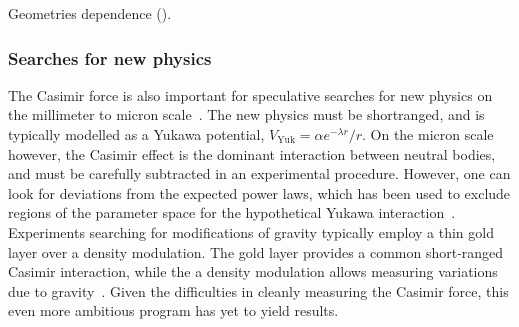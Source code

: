     Geometries dependence ().
    



\subsubsection{Searches for new physics}
The Casimir force is also important for speculative searches for new physics on the millimeter to micron
scale~\cite{Dimopoulos2003, Bezerra2011}.  The new physics must be shortranged, and is typically modelled as 
a Yukawa potential, $V_{\text{Yuk}}=\alpha e^{-\lambda r}/r$.  
On the micron scale however, the Casimir effect is the dominant interaction between neutral bodies,
 and must be carefully subtracted in an experimental procedure.
 However, one can look for deviations from the expected 
power laws, which has been used to exclude regions of the parameter space for the hypothetical
Yukawa interaction~\cite{Lamoreaux1997,Obrecht2007,Bezerra2011}.  
Experiments searching for modifications of gravity typically employ a thin gold layer over
a density modulation.  The gold layer provides a common short-ranged Casimir interaction, while the 
a density modulation allows measuring variations due to gravity~\cite{Sorrentino2009, Geraci2015}.
Given the difficulties in cleanly measuring the Casimir force, this even more ambitious program has yet 
to yield results.  

